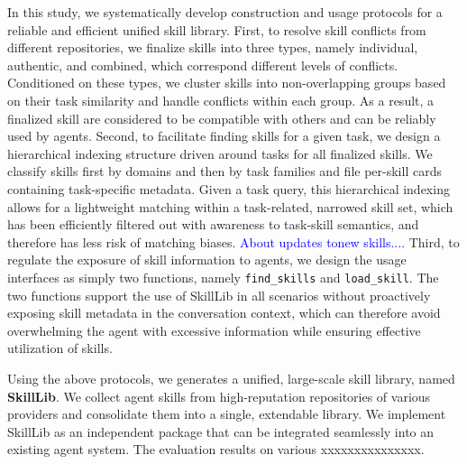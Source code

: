 \documentclass{article}
\theoremstyle{plain}
\theoremstyle{definition}
\theoremstyle{remark}
\begin{document}
In this study, we systematically develop construction and usage protocols for a reliable and efficient unified skill library. 
First, to resolve skill conflicts from different repositories, we finalize skills into three types, namely individual, authentic, and combined, which correspond different levels of conflicts. 
Conditioned on these types, we cluster skills into non-overlapping groups based on their task similarity and handle conflicts within each group.
As a result, a finalized skill are considered to be compatible with others and can be reliably used by agents.
Second, to facilitate finding skills for a given task, we design a hierarchical indexing structure driven around tasks for all finalized skills.
We classify skills first by domains and then by task families and file per-skill cards containing task-specific metadata.
Given a task query, this hierarchical indexing allows for a lightweight matching within a task-related, narrowed skill set, which has been efficiently filtered out with awareness to task-skill semantics, and therefore has less risk of matching biases.
\textcolor{blue}{About updates tonew skills....}
Third, to regulate the exposure of skill information to agents, we design the usage interfaces as simply two functions, namely \texttt{find\_skills} and \texttt{load\_skill}.
The two functions support the use of SkillLib in all scenarios without proactively exposing skill metadata in the conversation context, which can therefore avoid overwhelming the agent with excessive information while ensuring effective utilization of skills. 

Using the above protocols, we generates a unified, large-scale skill library, named \textbf{SkillLib}. 
We collect agent skills from high-reputation repositories of various providers and consolidate them into a single, extendable library. 
We implement SkillLib as an independent package that can be integrated seamlessly into an existing agent system. 
The evaluation results on various xxxxxxxxxxxxxxx. 
\end{document}
